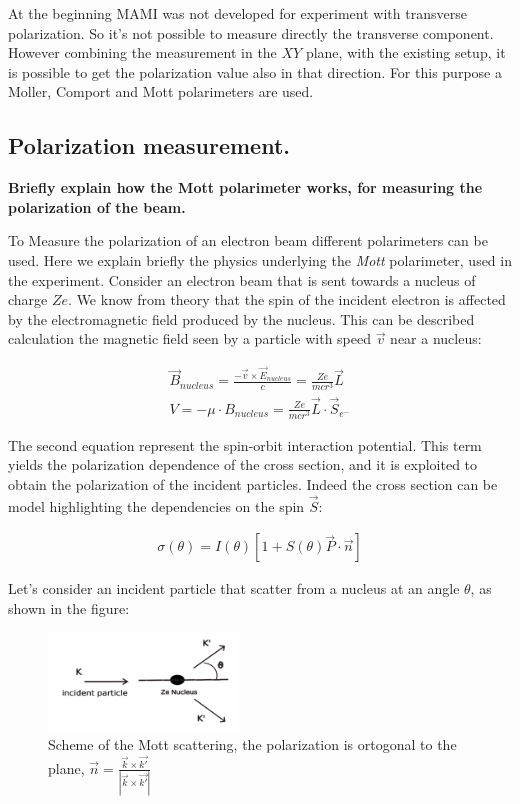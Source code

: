 At the beginning MAMI was not developed for experiment with transverse polarization. So it's not possible to measure directly the transverse component. However combining the measurement in the $XY$ plane, with the existing setup, it is possible to get the polarization value also in that direction. For this purpose a Moller, Comport and Mott polarimeters are used.


\subsection{Polarization measurement.}
{\bfseries Briefly explain how the Mott polarimeter works, for measuring the polarization of the beam.}

To Measure the polarization of an electron beam different polarimeters can be used. Here we explain briefly the physics underlying the \textit{Mott} polarimeter, used in the experiment.
Consider an electron beam that is sent towards a nucleus of charge $Ze$. We know from theory that the spin of the incident electron is affected by the electromagnetic field produced by the nucleus. This can be described calculation the magnetic field seen by a particle with speed $\vec{v}$ near a nucleus:

\begin{align*}
\vec{B}_{nucleus} = \frac{-\vec{v} \times \vec{E}_{nucleus}}{c}  = \frac{Ze}{mc r^{3}} \vec{L} \\
V = - \mu \cdot B_{nucleus} = \frac{Ze}{mcr^{3}} \vec{L} \cdot \vec{S}_{e^{-}}
\end{align*}

The second equation represent the spin-orbit interaction potential. This term yields the polarization dependence of the cross section, and it is exploited to obtain the polarization of the incident particles. Indeed the cross section can be model highlighting the dependencies on the spin $\vec{S}$:

\begin{align*}
\sigma(\theta) = I(\theta) [1 + S(\theta) \vec{P} \cdot \vec{n} ]
\end{align*}

Let's consider an incident particle that scatter from a nucleus at an angle $\theta$, as shown in the figure:

\begin{figure}[hbtp]
\centering
\includegraphics[width = 0.45\textwidth]{ExperimentalSetup/mottFig.png}
\caption{Scheme of the Mott scattering, the polarization is ortogonal to the plane,  $ \vec{n} = \frac{\vec{k} \times \vec{k'}}{|\vec{k} \times \vec{k'}|}$}
\end{figure}

